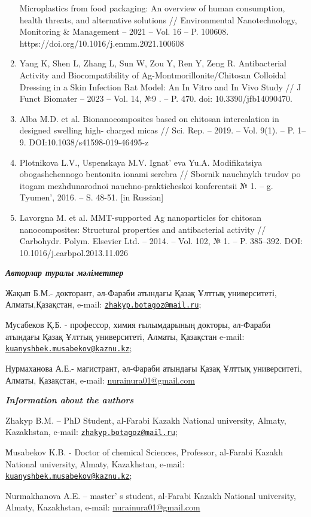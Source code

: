 \begin{enumerate}
  Microplastics from food packaging: An overview of human consumption,
  health threats, and alternative solutions // Environmental
  Nanotechnology, Monitoring \& Management -- 2021 -- Vol. 16 -- P.
  100608. https://doi.org/10.1016/j.enmm.2021.100608
\item
  Yang K, Shen L, Zhang L, Sun W, Zou Y, Ren Y, Zeng R. Antibacterial
  Activity and Biocompatibility of Ag-Montmorillonite/Chitosan Colloidal
  Dressing in a Skin Infection Rat Model: An In Vitro and In Vivo Study
  // J Funct Biomater -- 2023 -- Vol. 14, №9 . -- P. 470. doi:
  10.3390/jfb14090470.
\item
  Alba M.D. et al. Bionanocomposites based on chitosan intercalation in
  designed swelling high- charged micas // Sci. Rep. -- 2019. -- Vol.
  9(1). -- P. 1--9. DOI:10.1038/s41598-019-46495-z
\item
  Plotnikova L.V., Uspenskaya M.V. Ignat' eva Yu.A.
  Modifikatsiya obogashchennogo bentonita ionami serebra // Sbornik
  nauchnykh trudov po itogam mezhdunarodnoi nauchno-prakticheskoi
  konferentsii № 1. -- g. Tyumen', 2016. -- S. 48-51.
  {[}in Russian{]}
\item
  Lavorgna M. et al. MMT-supported Ag nanoparticles for chitosan
  nanocomposites: Structural properties and antibacterial activity //
  Carbohydr. Polym. Elsevier Ltd. -- 2014. -- Vol. 102, № 1. -- P.
  385--392. DOI: 10.1016/j.carbpol.2013.11.026
\end{enumerate}

\emph{{\bfseries Авторлар туралы мәліметтер}}

Жақып Б.М.- докторант, әл-Фараби атындағы Қазақ Ұлттық университеті,
Алматы,Қазақстан, e-mail:
\href{mailto:zhakyp.botagoz@mail.ru}{\nolinkurl{zhakyp.botagoz@mail.ru}};

Мусабеков Қ.Б. - профессор, химия ғылымдарының докторы, әл-Фараби
атындағы Қазақ Ұлттық университеті, Алматы, Қазақстан e-mail:
\href{mailto:kuanyshbek.musabekov@kaznu.kz}{\nolinkurl{kuanyshbek.musabekov@kaznu.kz}};

Нурмаханова А.Е.- магистрант, әл-Фараби атындағы Қазақ Ұлттық
университеті, Алматы, Қазақстан, e-mail:
\href{mailto:zhakyp.botagoz@mail.ru}{nurainura01@gmail.com}

\emph{{\bfseries Information about the authors}}

Zhakyp B.M. -- PhD Student, al-Farabi Kazakh National university,
Almaty, Kazakhstan, e-mail:
\href{mailto:zhakyp.botagoz@mail.ru}{\nolinkurl{zhakyp.botagoz@mail.ru}};

Мusabekov K.B. - Doctor of chemical Sciences, Professor, al-Farabi
Kazakh National university, Almaty, Kazakhstan, e-mail:
\href{mailto:kuanyshbek.musabekov@kaznu.kz}{\nolinkurl{kuanyshbek.musabekov@kaznu.kz}};

Nurmakhanova A.E. -- master' s student, al-Farabi Kazakh
National university, Almaty, Kazakhstan, e-mail:
\href{mailto:zhakyp.botagoz@mail.ru}{nurainura01@gmail.com}